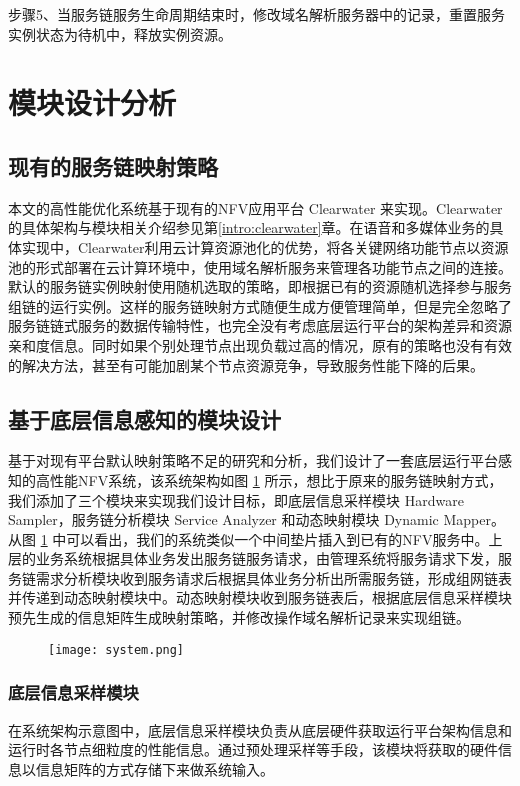 步骤5、当服务链服务生命周期结束时，修改域名解析服务器中的记录，重置服务实例状态为待机中，释放实例资源。


\section{模块设计分析}
\subsection{现有的服务链映射策略}
本文的高性能优化系统基于现有的NFV应用平台 Clearwater 来实现。Clearwater的具体架构与模块相关介绍参见第\ref{intro:clearwater}章。在语音和多媒体业务的具体实现中，Clearwater利用云计算资源池化的优势，将各关键网络功能节点以资源池的形式部署在云计算环境中，使用域名解析服务来管理各功能节点之间的连接。默认的服务链实例映射使用随机选取的策略，即根据已有的资源随机选择参与服务组链的运行实例。这样的服务链映射方式随便生成方便管理简单，但是完全忽略了服务链链式服务的数据传输特性，也完全没有考虑底层运行平台的架构差异和资源亲和度信息。同时如果个别处理节点出现负载过高的情况，原有的策略也没有有效的解决方法，甚至有可能加剧某个节点资源竞争，导致服务性能下降的后果。
\subsection{基于底层信息感知的模块设计}
基于对现有平台默认映射策略不足的研究和分析，我们设计了一套底层运行平台感知的高性能NFV系统，该系统架构如图 \ref{fig:system} 所示，想比于原来的服务链映射方式，我们添加了三个模块来实现我们设计目标，即底层信息采样模块 Hardware Sampler，服务链分析模块 Service Analyzer 和动态映射模块 Dynamic Mapper。从图 \ref{fig:system} 中可以看出，我们的系统类似一个中间垫片插入到已有的NFV服务中。上层的业务系统根据具体业务发出服务链服务请求，由管理系统将服务请求下发，服务链需求分析模块收到服务请求后根据具体业务分析出所需服务链，形成组网链表并传递到动态映射模块中。动态映射模块收到服务链表后，根据底层信息采样模块预先生成的信息矩阵生成映射策略，并修改操作域名解析记录来实现组链。
\begin{figure}[!htp]
	\label{fig:system}
	\centering
	\texttt{[image: system.png]}
\end{figure}
\subsubsection{底层信息采样模块}
在系统架构示意图中，底层信息采样模块负责从底层硬件获取运行平台架构信息和运行时各节点细粒度的性能信息。通过预处理采样等手段，该模块将获取的硬件信息以信息矩阵的方式存储下来做系统输入。

